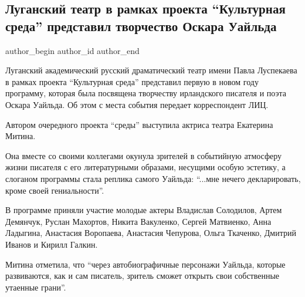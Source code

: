  
 
 
 
 
\subsection{Луганский театр в рамках проекта \enquote{Культурная среда} представил творчество Оскара Уайльда}
\label{sec:05_01_2022.stz.news.lnr.lug_info.1.teatr_oskar_uald}

\ifcmt
 author_begin
   author_id  
 author_end
\fi

Луганский академический русский драматический театр имени Павла Луспекаева в
рамках проекта \enquote{Культурная среда} представил первую в новом году программу,
которая была посвящена творчеству ирландского писателя и поэта Оскара Уайльда.
Об этом с места события передает корреспондент ЛИЦ.


Автором очередного проекта \enquote{среды} выступила актриса театра Екатерина Митина.

Она вместе со своими коллегами окунула зрителей в событийную атмосферу жизни
писателя с его литературными образами, несущими особую эстетику, а слоганом
программы стала реплика самого Уайльда: \enquote{...мне нечего декларировать, кроме своей
гениальности}.


В программе приняли участие молодые актеры Владислав Солодилов, Артем Демянчук,
Руслан Махортов, Никита Вакуленко, Сергей Матвиенко, Анна Ладыгина, Анастасия
Воропаева, Анастасия Чепурова, Ольга Ткаченко, Дмитрий Иванов и Кирилл Галкин.


Митина отметила, что \enquote{через автобиографичные персонажи Уайльда, которые
развиваются, как и сам писатель, зритель сможет открыть свои собственные
утаенные грани}.

